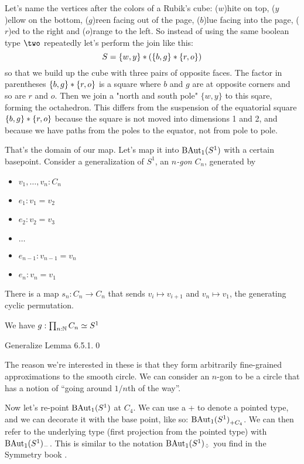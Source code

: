 \documentclass[12pt]{article}
\begin{document}
Let's name the vertices after the colors of a Rubik's cube: (\( w \))hite on top, (\( y \))ellow on the bottom, (\( g \))reen facing out of the page, (\( b \))lue facing into the page, (\( r \))ed to the right and (\( o \))range to the left. So instead of using the same boolean type \( \two \) repeatedly let's perform the join like this: 
\[ 
S=\{w, y\}* (\{b, g\}*\{r, o\}) 
\] so that we build up the cube with three pairs of opposite faces. The factor in parentheses \( \{b, g\}*\{r, o\} \) is a square where \( b \) and \( g \) are at opposite corners and so are \( r \) and \( o \). Then we join a "north and south pole" \( \{w, y\} \) to this sqare, forming the octahedron. This differs from the suspension of the equatorial square \( \{b, g\}*\{r, o\} \) because the square is not moved into dimensions 1 and 2, and because we have paths from the poles to the equator, not from pole to pole.

That's the domain of our map. Let's map it into \( \mathrm{BAut}_1(S^1) \) with a certain basepoint. Consider a generalization of \( S^1 \),  an \emph{\( n \)-gon} \( C_n \), generated by
\begin{itemize}
\item \( v_1,\ldots,v_n:C_n \)
\item \( e_1:v_1=v_2\)
\item \( e_2:v_2=v_3 \)
\item \( \ldots \) 
\item \(e_{n-1}:v_{n-1}=v_n\)
\item \(e_n:v_n=v_1 \)
\end{itemize}

There is a map \( s_n:C_n\to C_n \) that sends \( v_i\mapsto v_{i+1} \) and \( v_n\mapsto v_1 \), the generating cyclic permutation. 

\begin{mylemma}
  We have \( g:\prod_{n:\mathbb{N}}C_n\simeq S^1 \)
\end{mylemma}
\proof Generalize \cite{hottbook} Lemma 6.5.1.\qed

The reason we're interested in these is that they form arbitrarily fine-grained approximations to the smooth circle. We can consider an \( n \)-gon to be a circle that has a notion of ``going around \( 1/n \)th of the way''.

Now let's re-point \( \mathrm{BAut}_1(S^1) \) at \( C_4 \). We can use a + to denote a pointed type, and we can decorate it with the base point, like so: \( {\mathrm{BAut}_1(S^1)}_{+{C_4}} \). We can then refer to the underlying type (first projection from the pointed type) with \( \mathrm{BAut}_1(S^1)_- \). This is similar to the notation \( \mathrm{BAut}_1(S^1)_{\div} \) you find in the Symmetry book \cite{Symmetry}.
\end{document}
